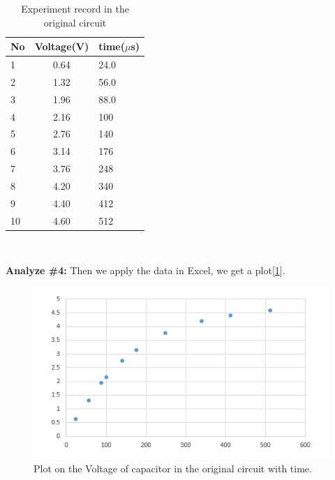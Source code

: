 \begin{table}[!htbp]\centering
	\caption{Experiment record in the original circuit}
	\renewcommand\arraystretch{1.5}
	\begin{tabular}{lcl}
		\toprule
		No		&Voltage(V)	&time($\mu$s)	\\
		\midrule
		1		&0.64		&24.0		\\
		
		2		&1.32		&56.0		\\
		
		3		&1.96		&88.0		\\
		
		4		&2.16		&100		\\
		
		5		&2.76		&140		\\
		
		6		&3.14		&176		\\
		
		7		&3.76		&248		\\
		
		8		&4.20		&340		\\
		
		9		&4.40		&412		\\
		
		10		&4.60		&512		\\
		\bottomrule
	\end{tabular}\\
\end{table}
\textbf{Analyze \#4:} \newline
\phantom{ } Then we apply the data in Excel, we get a plot[\ref{fig:2.1}].\\
\begin{figure}[!htbp]
	\centering %
	\includegraphics[width=\linewidth]{images/2_1.PNG} %
	\caption{Plot on the Voltage of capacitor in the original circuit with time.} %
	\label{fig:2.1} %
\end{figure}
